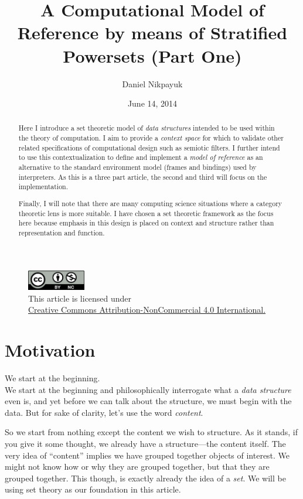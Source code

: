 \documentclass[twoside]{article}
\title{A Computational Model of Reference by means of Stratified Powersets (Part One)}
\author{Daniel Nikpayuk}
\date{June 14, 2014}
\begin{document}
\maketitle
\thispagestyle{empty}

\begin{figure}[h]
\centering
\includegraphics[width=1in]{../../../cc-by-nc.png}\\[0.1in]
\tiny This article is licensed under \\
\href{http://creativecommons.org/licenses/by-nc/4.0/}
{Creative Commons Attribution-NonCommercial 4.0 International.}\\[0.3in]
\end{figure}

\begin{abstract}
Here I introduce a set theoretic model of \emph{data structures} intended to be used within the theory of computation.
I aim to provide a \emph{context space} for which to validate other related specifications of computational design such
as semiotic filters. I further intend to use this contextualization to define and implement a \emph{model of reference}
as an alternative to the standard environment model (frames and bindings) used by interpreters. As this is a three part
article, the second and third will focus on the implementation.

Finally, I will note that there are many computing science situations where a category theoretic lens is more suitable.
I have chosen a set theoretic framework as the focus here because emphasis in this design is placed on context and structure
rather than representation and function.
\end{abstract}

\section*{Motivation}

We start at the beginning.\\[0.1cm]

We start at the beginning and philosophically interrogate what a \emph{data structure} even is, and yet before we can talk about
the structure, we must begin with the data. But for sake of clarity, let's use the word \emph{content}.

So we start from nothing except the content we wish to structure. As it stands, if you give it some
thought, we already have a structure---the content itself. The very idea of ``content'' implies we have grouped together
objects of interest. We might not know how or why they are grouped together, but that they are grouped together. This though,
is exactly already the idea of a \emph{set}. We will be using set theory as our foundation in this article.
\end{document}
